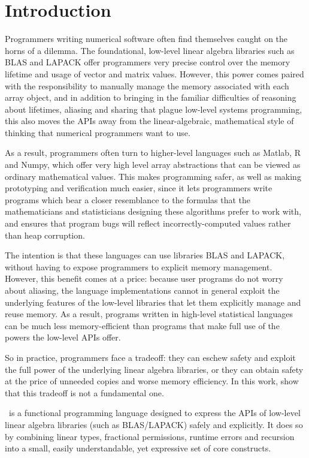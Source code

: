 \section{Introduction}

Programmers writing numerical software often find themselves caught on
the horns of a dilemma. The foundational, low-level linear algebra
libraries such as BLAS and LAPACK offer programmers very precise
control over the memory lifetime and usage of vector and matrix
values. However, this power comes paired with the responsibility to
manually manage the memory associated with each array object, and in
addition to bringing in the familiar difficulties of reasoning about
lifetimes, aliasing and sharing that plague low-level systems
programming, this also moves the APIs away from the linear-algebraic,
mathematical style of thinking that numerical programmers want to use.

As a result, programmers often turn to higher-level languages such as
Matlab, R and Numpy, which offer very high level array abstractions
that can be viewed as ordinary mathematical values. This makes
programming safer, as well as making prototyping and verification much
easier, since it lets programmers write programs which bear a closer
resemblance to the formulas that the mathematicians and statisticians
designing these algorithms prefer to work with, and ensures that
program bugs will reflect incorrectly-computed values rather than heap
corruption.

The intention is that these languages can use libraries BLAS and
LAPACK, without having to expose programmers to explicit memory
management. However, this benefit comes at a price: because user
programs do not worry about aliasing, the language implementations
cannot in general exploit the underlying features of the low-level
libraries that let them explicitly manage and reuse memory. As a
result, programs written in high-level statistical languages can
be much less memory-efficient than programs that make full use
of the powers the low-level APIs offer. 

So in practice, programmers face a tradeoff: they can eschew safety
and exploit the full power of the underlying linear algebra libraries,
or they can obtain safety at the price of unneeded copies and worse
memory efficiency. In this work, show that this tradeoff is not a
fundamental one.


\lang\ is a functional programming language designed to express the
APIs of low-level linear algebra libraries (such as BLAS/LAPACK)
safely and explicitly.  It does so by combining linear types,
fractional permissions, runtime errors and recursion into a small,
easily understandable, yet expressive set of core constructs.

